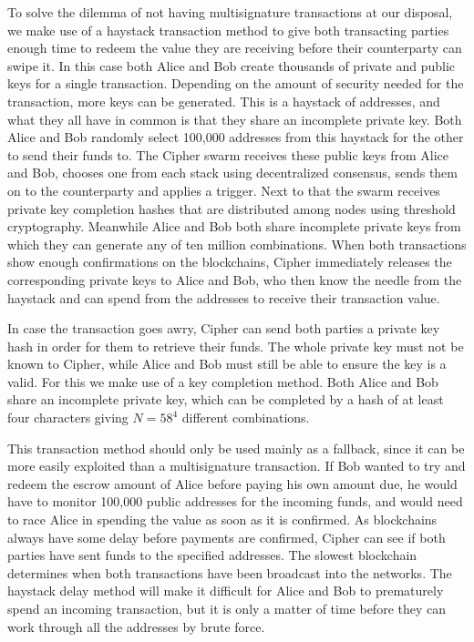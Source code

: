 \documentclass[a4paper]{article}
\begin{document}
To solve the dilemma of not having multisignature transactions at our disposal, we make use of a haystack transaction method to give both transacting parties enough time to redeem the value they are receiving before their counterparty can swipe it. In this case both Alice and Bob create thousands of private and public keys for a single transaction. Depending on the amount of security needed for the transaction, more keys can be generated. This is a haystack of addresses, and what they all have in common is that they share an incomplete private key. Both Alice and Bob randomly select 100,000 addresses from this haystack for the other to send their funds to. The Cipher swarm receives these public keys from Alice and Bob, chooses one from each stack using decentralized consensus, sends them on to the counterparty and applies a trigger. Next to that the swarm receives private key completion hashes that are distributed among nodes using threshold cryptography. Meanwhile Alice and Bob both share incomplete private keys from which they can generate any of ten million combinations. When both transactions show enough confirmations on the blockchains, Cipher immediately releases the corresponding private keys to Alice and Bob, who then know the needle from the haystack and can spend from the addresses to receive their transaction value.

In case the transaction goes awry, Cipher can send both parties a private key hash in order for them to retrieve their funds. The whole private key must not be known to Cipher, while Alice and Bob must still be able to ensure the key is a valid. For this we make use of a key completion method. Both Alice and Bob share an incomplete private key, which can be completed by a hash of at least four characters giving $N=58^4$ different combinations.


This transaction method should only be used mainly as a fallback, since it can be more easily exploited than a multisignature transaction. If Bob wanted to try and redeem the escrow amount of Alice before paying his own amount due, he would have to monitor 100,000 public addresses for the incoming funds, and would need to race Alice in spending the value as soon as it is confirmed. As blockchains always have some delay before payments are confirmed, Cipher can see if both parties have sent funds to the specified addresses. The slowest blockchain determines when both transactions have been broadcast into the networks. The haystack delay method will make it difficult for Alice and Bob to prematurely spend an incoming transaction, but it is only a matter of time before they can work through all the addresses by brute force.
\end{document}
